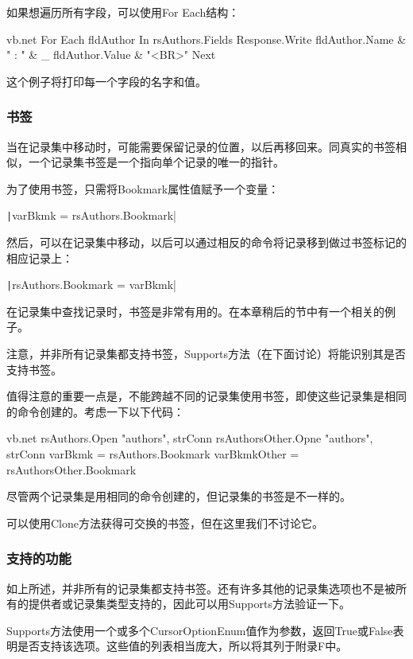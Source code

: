 如果想遍历所有字段，可以使用For Each结构：
\begin{amzcode}{vb.net}
For Each fldAuthor In rsAuthors.Fields
       Response.Write fldAuthor.Name & " : " & _
                             fldAuthor.Value & "{\textless}BR{\textgreater}"
Next
\end{amzcode}
这个例子将打印每一个字段的名字和值。

\subsubsection{书签}

当在记录集中移动时，可能需要保留记录的位置，以后再移回来。同真实的书签相似，一个记录集书签是一个指向单个记录的唯一的指针。

为了使用书签，只需将Bookmark属性值赋予一个变量：

\texttt|varBkmk = rsAuthors.Bookmark|

然后，可以在记录集中移动，以后可以通过相反的命令将记录移到做过书签标记的相应记录上：

\texttt|rsAuthors.Bookmark = varBkmk|

在记录集中查找记录时，书签是非常有用的。在本章稍后的节中有一个相关的例子。

注意，并非所有记录集都支持书签，Supports方法（在下面讨论）将能识别其是否支持书签。

值得注意的重要一点是，不能跨越不同的记录集使用书签，即使这些记录集是相同的命令创建的。考虑一下以下代码：
\begin{amzcode}{vb.net}
rsAuthors.Open "authors", strConn
rsAuthorsOther.Opne "authors", strConn
varBkmk = rsAuthors.Bookmark
varBkmkOther = rsAuthorsOther.Bookmark
\end{amzcode}
尽管两个记录集是用相同的命令创建的，但记录集的书签是不一样的。

可以使用Clone方法获得可交换的书签，但在这里我们不讨论它。

\subsubsection{支持的功能}

如上所述，并非所有的记录集都支持书签。还有许多其他的记录集选项也不是被所有的提供者或记录集类型支持的，因此可以用Supports方法验证一下。

Supports方法使用一个或多个CursorOptionEnum值作为参数，返回True或False表明是否支持该选项。这些值的列表相当庞大，所以将其列于附录F中。

